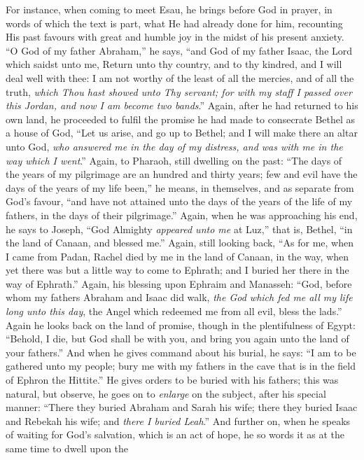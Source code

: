 For instance, when coming to meet Esau, he brings before God in
prayer, in words of which the text is part, what He had already done
for him, recounting His past favours with great and humble joy in the
midst of his present anxiety. ``O God of my father Abraham,''
he says, ``and God of my father Isaac, the Lord which saidst unto
me, Return unto thy country, and to thy kindred, and I will deal well
with thee: I am not worthy of the least of all the mercies, and of all
the truth, \emph{which Thou hast showed unto Thy servant; for with my
staff I passed over this Jordan, and now I am become two bands}.''
Again, after he had returned to his own land, he proceeded to fulfil
the promise he had made to consecrate Bethel as a house of God,
``Let us arise, and go up to Bethel; and I will make there an
altar unto God, \emph{who answered me in the day of my distress, and was
with me in the way which I went}.'' Again, to Pharaoh, still
dwelling on the past: ``The days of the years of my pilgrimage are
an hundred and thirty years; few and evil have the days of the years
of my life been,'' he means, in themselves, and as separate from
God's favour, ``and have not attained unto the days of the years
of the life of my fathers, in the days of their pilgrimage.''
Again, when he was approaching his end, he says to Joseph, ``God
Almighty \emph{appeared unto me} at Luz,'' that is, Bethel,
``in the land of Canaan, and blessed me.'' Again, still
looking back, ``As for me, when I came from Padan, Rachel died by
me in the land of Canaan, in the way, when yet there was but a little
way to come to Ephrath; and I buried her there in the way of Ephrath.''
Again, his blessing upon Ephraim and Manasseh: ``God, before whom
my fathers Abraham and Isaac did walk, \emph{the God which fed me all my
life long unto this day}, the Angel which redeemed me from all
evil, bless the lads.'' Again he looks back on the land of
promise, though in the plentifulness of Egypt: ``Behold, I die,
but God shall be with you, and bring you again unto the land of your
fathers.'' And when he gives command about his burial, he says:
``I am to be gathered unto my people; bury me with my fathers in
the cave that is in the field of Ephron the Hittite.'' He gives
orders to be buried with his fathers; this was natural, but observe,
he goes on to \emph{enlarge} on the subject, after his special manner:
``There they buried Abraham and Sarah his wife; there they buried
Isaac and Rebekah his wife; and \emph{there I buried Leah}.'' And
further on, when he speaks of waiting for God's salvation, which is an
act of hope, he so words it as at the same time to dwell upon the
